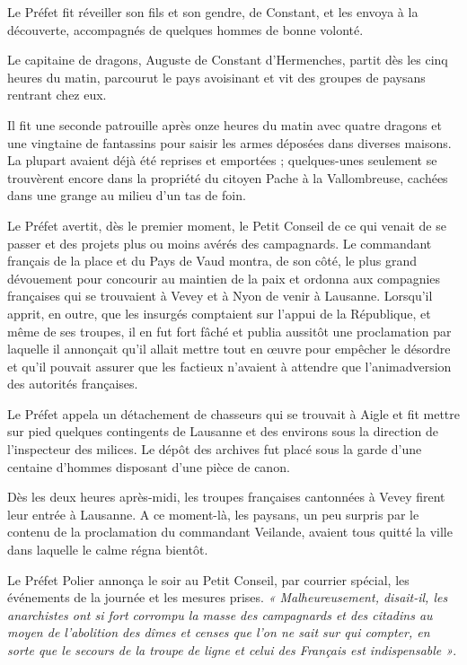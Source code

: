 \documentclass[french,twoside]{book} %
\begin{document}
\noindent Le Préfet fit réveiller son fils et son gendre, de Constant, et les envoya à la découverte, accompagnés de quelques hommes de bonne volonté.\par
Le capitaine de dragons, Auguste de Constant d’Hermenches, partit dès les cinq heures du matin, parcourut le pays avoisinant et vit des groupes de paysans rentrant chez eux.\par
Il fit une seconde patrouille après onze heures du matin avec quatre dragons et une vingtaine de fantassins pour saisir les armes déposées dans diverses maisons. La plupart avaient déjà été reprises et emportées ; quelques-unes seulement se trouvèrent encore dans la propriété du citoyen Pache à la Vallombreuse, cachées dans une grange au milieu d’un tas de foin.\par
Le Préfet avertit, dès le premier moment, le Petit Conseil de ce qui venait de se passer et des projets plus ou moins avérés des campagnards. Le commandant français de la place et du Pays de Vaud montra, de son côté, le plus grand dévouement pour concourir au maintien de la paix et ordonna aux compagnies françaises qui se trouvaient à Vevey et à Nyon de venir à Lausanne. Lorsqu’il apprit, en outre, que les insurgés comptaient sur l’appui de la République, et même de ses troupes, il en fut fort fâché et publia aussitôt une proclamation par laquelle il annonçait qu’il allait mettre tout en œuvre pour empêcher le désordre et qu’il pouvait assurer que les factieux n’avaient à attendre que l’animadversion des autorités françaises.\par
Le Préfet appela un détachement de chasseurs qui se trouvait à Aigle et fit mettre sur pied quelques contingents de Lausanne et des environs sous la direction de l’inspecteur des milices. Le dépôt des archives fut placé sous la garde d’une centaine d’hommes disposant d’une pièce de canon.\par
Dès les deux heures après-midi, les troupes françaises cantonnées à Vevey firent leur entrée à Lausanne. A ce moment-là, les paysans, un peu surpris par le contenu de la proclamation du commandant Veilande, avaient tous quitté la ville dans laquelle le calme régna bientôt.\par
Le Préfet Polier annonça le soir au Petit Conseil, par courrier spécial, les événements de la journée et les mesures prises. \emph{« Malheureusement, disait-il, les anarchistes ont si fort corrompu la masse des campagnards et des citadins au moyen de l’abolition des dîmes et censes que l’on ne sait sur qui compter, en sorte que le secours de la troupe de ligne et celui des Français est indispensable »}.
\end{document}

